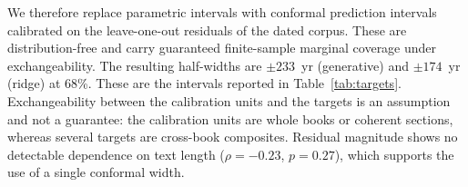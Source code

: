 We therefore replace parametric intervals with conformal prediction
intervals calibrated on the leave-one-out residuals of the dated corpus.
These are distribution-free and carry guaranteed finite-sample marginal
coverage under exchangeability.  The resulting half-widths are $\pm233$~yr
(generative) and $\pm174$~yr (ridge) at 68\%.  These are the intervals
reported in Table~\ref{tab:targets}.  Exchangeability between the
calibration units and the targets is an assumption and not a guarantee:
the calibration units are whole books or coherent sections, whereas several
targets are cross-book composites.  Residual magnitude shows no detectable
dependence on text length ($\rho = -0.23$, $p = 0.27$), which supports the
use of a single conformal width.
